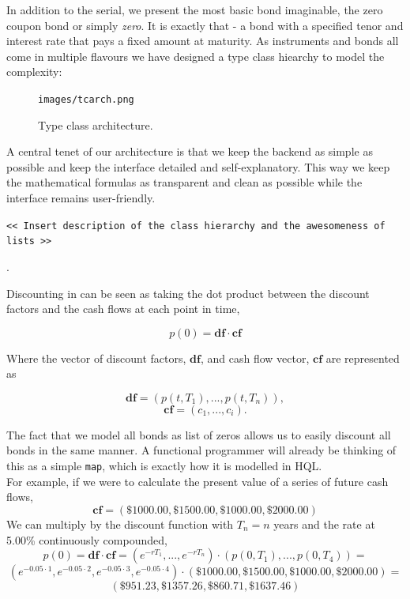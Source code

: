 In addition to the serial, we present the most basic bond imaginable, the zero 
coupon bond or simply \emph{zero}. It is exactly that - a bond with a specified 
tenor and interest rate that pays a fixed amount at maturity. As instruments and
bonds all come in multiple flavours we have designed a type class hiearchy to
model the complexity:

\begin{figure}[!htb]
\centering
\texttt{images/tcarch.png}
\caption{Type class architecture.}
\label{fig:comp02}
\end{figure}


A central tenet of our architecture is that we keep the backend
as simple as possible and keep the interface detailed and 
self-explanatory. This way we keep the mathematical formulas as transparent
and clean as possible while the interface remains user-friendly.\\

\begin{center}
\texttt{<< Insert description of the class hierarchy and the awesomeness of
lists >>}\\
\end{center}

.

Discounting in \hql can be seen as taking the dot product between the discount
factors and the cash flows at each point in time,

\[
p(0) = \mathbf{df}\cdot\mathbf{cf}
\]

Where the vector of discount factors, $\mathbf{df}$, and cash flow vector, $\mathbf{cf}$ are represented as

\[
\mathbf{df} = (p(t,T_1), ..., p(t,T_n)),
\]
\[
\mathbf{cf} = (c_1, ..., c_i).
\]

The fact that we model all bonds as list of zeros allows us to easily discount 
all bonds in the same manner. A functional programmer will already be thinking 
of this as a simple \texttt{map}, which is exactly how it is modelled in HQL.\\

For example, if we were to calculate the present value of a series of future cash flows,
	\[
	\mathbf{cf} = (\$1000.00,\$1500.00,\$1000.00,\$2000.00)
	\]
	We can multiply by the discount function with $T_n=n$ years and the rate at 5.00\% continuously compounded,
	\[
	p(0) = \mathbf{df}\cdot\mathbf{cf} = (e^{-rT_1},...,e^{-rT_n})\cdot(p(0,T_1), ...,p(0,T_4))=
	\]
	\[
	(e^{-0.05\cdot1},e^{-0.05\cdot2},e^{-0.05\cdot3},e^{-0.05\cdot4}) \cdot (\$1000.00,\$1500.00,\$1000.00,\$2000.00)=
	\]
	\[
	(\$951.23,\$1357.26,\$860.71,\$1637.46)
	\]

